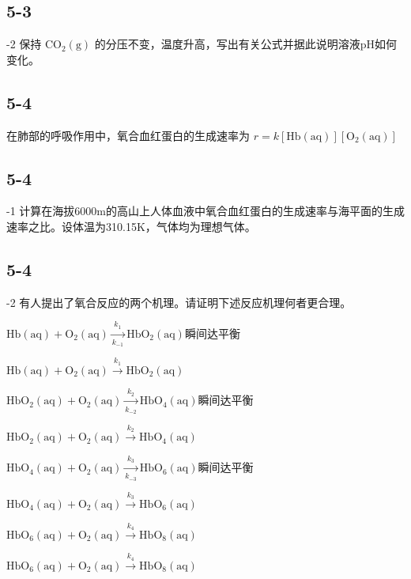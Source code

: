 \subsection*{5-3}
-2 保持 $\mathrm { C O _ { 2 } ( g ) }$ 的分压不变，温度升⾼，写出有关公式并据此说明溶液pH如何变化。

\subsection*{5-4}
在肺部的呼吸作⽤中，氧合⾎红蛋⽩的⽣成速率为 $r = k [ \mathrm { H b } ( \mathrm { a q } ) ] [ \mathrm { O } _ { 2 } ( \mathrm { a q } ) ]$

\subsection*{5-4}
-1 计算在海拔6000m的⾼⼭上⼈体⾎液中氧合⾎红蛋⽩的⽣成速率与海平⾯的⽣成速率之⽐。设体温为310.15K，⽓体均为理想⽓体。

\subsection*{5-4}
-2 有⼈提出了氧合反应的两个机理。请证明下述反应机理何者更合理。

$
\mathrm{Hb} (\mathrm{aq}) + \mathrm{O} _ {2} (\mathrm{aq}) \xrightarrow [ k _ {- 1} ]{k _ {1}} \mathrm{HbO} _ {2} (\mathrm{aq}) \text {瞬间达平衡}
$

$
\mathrm{Hb} (\mathrm{aq}) + \mathrm{O} _ {2} (\mathrm{aq}) \xrightarrow {k _ {1}} \mathrm{HbO} _ {2} (\mathrm{aq})
$

$
\mathrm{HbO} _ {2} (\mathrm{aq}) + \mathrm{O} _ {2} (\mathrm{aq}) \xrightarrow [ k _ {- 2} ]{k _ {2}} \mathrm{HbO} _ {4} (\mathrm{aq}) \text {瞬间达平衡}
$

$
\mathrm{HbO} _ {2} (\mathrm{aq}) + \mathrm{O} _ {2} (\mathrm{aq}) \xrightarrow {k _ {2}} \mathrm{HbO} _ {4} (\mathrm{aq})
$

$
\mathrm{HbO} _ {4} (\mathrm{aq}) + \mathrm{O} _ {2} (\mathrm{aq}) \xrightarrow [ k _ {- 3} ]{k _ {3}} \mathrm{HbO} _ {6} (\mathrm{aq}) \text {瞬间达平衡}
$

$
\mathrm{HbO} _ {4} (\mathrm{aq}) + \mathrm{O} _ {2} (\mathrm{aq}) \xrightarrow {k _ {3}} \mathrm{HbO} _ {6} (\mathrm{aq})
$

$
\mathrm{HbO} _ {6} (\mathrm{aq}) + \mathrm{O} _ {2} (\mathrm{aq}) \xrightarrow {k _ {4}} \mathrm{HbO} _ {8} (\mathrm{aq})
$

$
\mathrm{HbO} _ {6} (\mathrm{aq}) + \mathrm{O} _ {2} (\mathrm{aq}) \xrightarrow {k _ {4}} \mathrm{HbO} _ {8} (\mathrm{aq})
$

